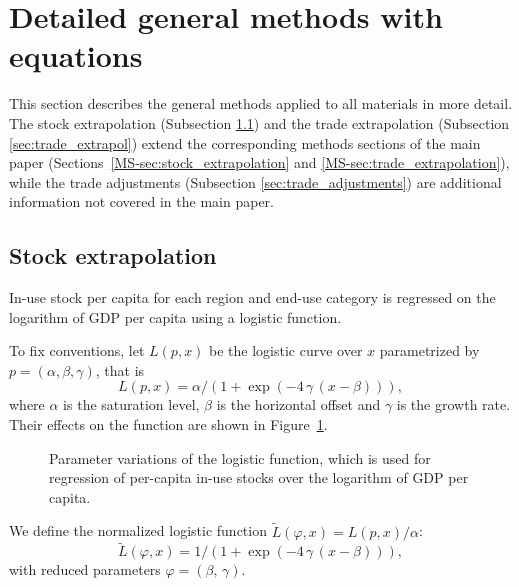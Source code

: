 
\section{Detailed general methods with equations}

This section describes the general methods applied to all materials in more detail. The stock extrapolation (Subsection \ref{sec:stock_extrapol}) and the trade extrapolation (Subsection \ref{sec:trade_extrapol}) extend the corresponding methods sections of the main paper (Sections~\ref{MS-sec:stock_extrapolation} and \ref{MS-sec:trade_extrapolation}), while the trade adjustments (Subsection \ref{sec:trade_adjustments}) are additional information not covered in the main paper.


\subsection{Stock extrapolation} \label{sec:stock_extrapol}

In-use stock per capita for each region and end-use category is regressed on the logarithm of GDP per capita using a logistic function.

To fix conventions, let $L(p,x)$ be the logistic curve over $x$ parametrized by $p = (\alpha,\beta,\gamma)$, that is
\begin{equation}
    L(p,x) =  \alpha / (1 + \exp(-4\,\gamma\,(x - \beta))),
\end{equation}
where $\alpha$ is the saturation level, $\beta$ is the horizontal offset and $\gamma$ is the growth rate. Their effects on the function are shown in Figure~\ref{fig:logistic}.

\begin{figure}[htbp]
    \centering
    \caption{Parameter variations of the logistic function, which is used for regression of per-capita in-use stocks over the logarithm of GDP per capita.}
    \label{fig:logistic}
\end{figure}

We define the normalized logistic function $\tilde{L}(\varphi,x) = L(p,x)/\alpha$:
\begin{equation}
    \tilde{L}(\varphi,x) =  1 / (1 + \exp(-4\,\gamma\,(x - \beta))),
\end{equation}
with reduced parameters $\varphi = (\beta,\,\gamma)$.

